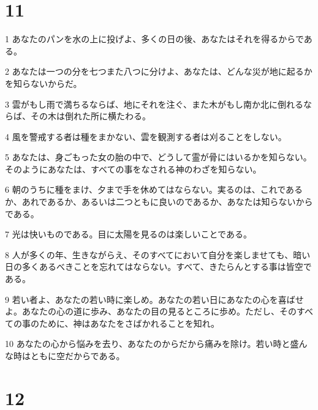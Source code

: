 \chapter{11}

\par 1 あなたのパンを水の上に投げよ、多くの日の後、あなたはそれを得るからである。
\par 2 あなたは一つの分を七つまた八つに分けよ、あなたは、どんな災が地に起るかを知らないからだ。
\par 3 雲がもし雨で満ちるならば、地にそれを注ぐ、また木がもし南か北に倒れるならば、その木は倒れた所に横たわる。
\par 4 風を警戒する者は種をまかない、雲を観測する者は刈ることをしない。
\par 5 あなたは、身ごもった女の胎の中で、どうして霊が骨にはいるかを知らない。そのようにあなたは、すべての事をなされる神のわざを知らない。
\par 6 朝のうちに種をまけ、夕まで手を休めてはならない。実るのは、これであるか、あれであるか、あるいは二つともに良いのであるか、あなたは知らないからである。
\par 7 光は快いものである。目に太陽を見るのは楽しいことである。
\par 8 人が多くの年、生きながらえ、そのすべてにおいて自分を楽しませても、暗い日の多くあるべきことを忘れてはならない。すべて、きたらんとする事は皆空である。
\par 9 若い者よ、あなたの若い時に楽しめ。あなたの若い日にあなたの心を喜ばせよ。あなたの心の道に歩み、あなたの目の見るところに歩め。ただし、そのすべての事のために、神はあなたをさばかれることを知れ。
\par 10 あなたの心から悩みを去り、あなたのからだから痛みを除け。若い時と盛んな時はともに空だからである。

\chapter{12}

